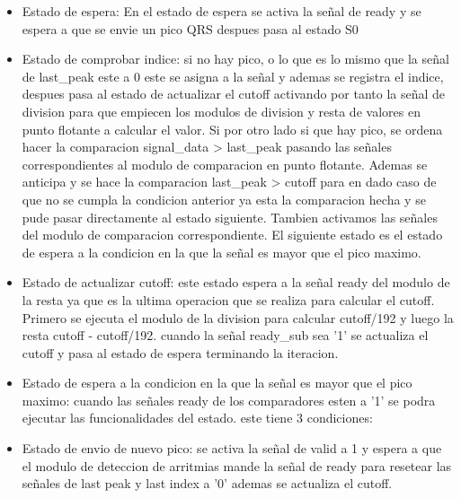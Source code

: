 \begin{itemize}
    \item Estado de espera: En el estado de espera se activa la señal de ready y se espera a que se envie un pico QRS despues pasa al estado S0
    \item Estado de comprobar indice: si no hay pico, o lo que es lo mismo que la señal de last\_peak este a 0 este se asigna
     a la señal y ademas se registra el indice, despues pasa al estado de actualizar el cutoff activando por tanto la señal de 
     division para que empiecen los modulos de division y resta de valores en punto flotante a calcular el valor. Si por otro
     lado si que hay pico, se ordena hacer la comparacion signal\_data > last\_peak pasando las señales correspondientes al modulo de comparacion en 
     punto flotante. Ademas se anticipa y se hace la comparacion last\_peak > cutoff para en dado caso de que no se cumpla la 
     condicion anterior ya esta la comparacion hecha y se pude pasar directamente al estado siguiente. Tambien activamos las señales
     del modulo de comparacion correspondiente. El siguiente estado es el estado de espera a la condicion en la que la señal es mayor 
     que el pico maximo.
    \item Estado de actualizar cutoff: este estado espera a la señal ready del modulo de la resta ya que es la ultima operacion que se realiza para 
    calcular el cutoff. Primero se ejecuta el modulo de la division para calcular cutoff/192 y luego la resta cutoff - cutoff/192. cuando la señal
    ready\_sub sea '1' se actualiza el cutoff y pasa al estado de espera terminando la iteracion. 
    \item Estado de espera a la condicion en la que la señal es mayor que el pico maximo: cuando las señales ready de los comparadores esten a '1' 
    se podra ejecutar las funcionalidades del estado. este tiene 3 condiciones:
    
    \item Estado de envio de nuevo pico: se activa la señal de valid a 1 y espera a que el modulo de deteccion de arritmias mande la señal de ready para resetear 
    las señales de last peak y last index a '0' ademas se actualiza el cutoff.
\end{itemize}
\lstset{language=VHDL, breaklines=true, basicstyle=\footnotesize}
